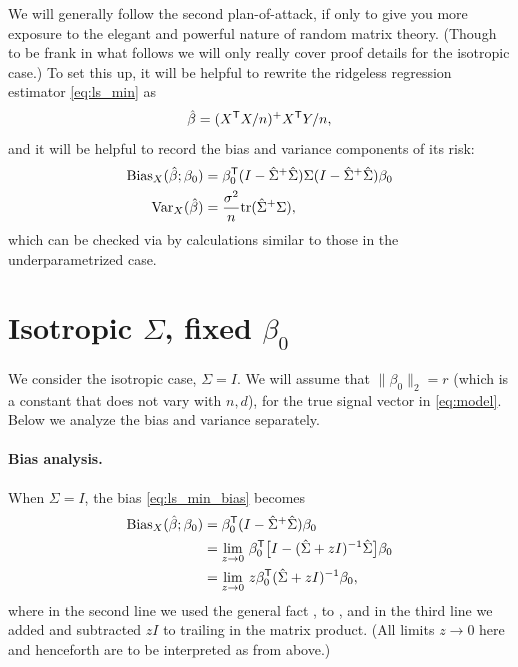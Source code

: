 \documentclass{article}
\begin{document}
We will generally follow the second plan-of-attack, if only to give you more
exposure to the elegant and powerful nature of random matrix theory. (Though to
be frank in what follows we will only really cover proof details for the
isotropic case.) To set this up, it will be helpful to rewrite the ridgeless
regression estimator   
\eqref{eq:ls_min} as   
\[
\hat{\beta} = (X^{\mathsf{T}} X/n)^+ X^{\mathsf{T}} Y/n,
\]
and it will be helpful to record the bias and variance components of its risk: 
\begin{align}
\label{eq:ls_min_bias}
\mathrm{Bias}_X(\hat{\beta}; \beta_0) &= \beta_0^{\mathsf{T}} (I - \hat\Sigma^+ \hat\Sigma) \Sigma 
  (I - \hat\Sigma^+ \hat\Sigma) \beta_0 \\  
\label{eq:ls_min_var}
\mathrm{Var}_X(\hat{\beta}) &= \frac{\sigma^2}{n} \mathrm{tr} (\hat\Sigma^+ \Sigma),
\end{align}
which can be checked via by calculations similar to those in the underparametrized case.    

\section{Isotropic $\Sigma$, fixed $\beta_0$}

We consider the isotropic case, $\Sigma = I$.  We will assume that $\|\beta_0\|_2
= r$ (which is a constant that does not vary with $n,d$), for the true signal
vector in \eqref{eq:model}. Below we analyze the bias and variance separately.

\paragraph{Bias analysis.}

When $\Sigma = I$, the bias \eqref{eq:ls_min_bias} becomes 
\begin{align}
\nonumber
\mathrm{Bias}_X(\hat{\beta}; \beta_0) 
&= \beta_0^{\mathsf{T}} (I - \hat\Sigma^+ \hat\Sigma) \beta_0 \\ 
\nonumber
&= \lim_{z \to 0} \, \beta_0^{\mathsf{T}} \big[ I - (\hat\Sigma + zI)^{-1} \hat\Sigma \big]
  \beta_0 \\   
\label{eq:ls_min_bias_iso}
&= \lim_{z \to 0} \, z \beta_0^{\mathsf{T}} (\hat\Sigma + zI)^{-1} \beta_0, 
\end{align}
where in the second line we used the general fact , to , and 
in the third line we added and subtracted $zI$ to trailing \smash{$\hSigma$} in
the matrix product. (All limits $z \to 0$ here and henceforth are to be
interpreted as from above.)
\end{document}
